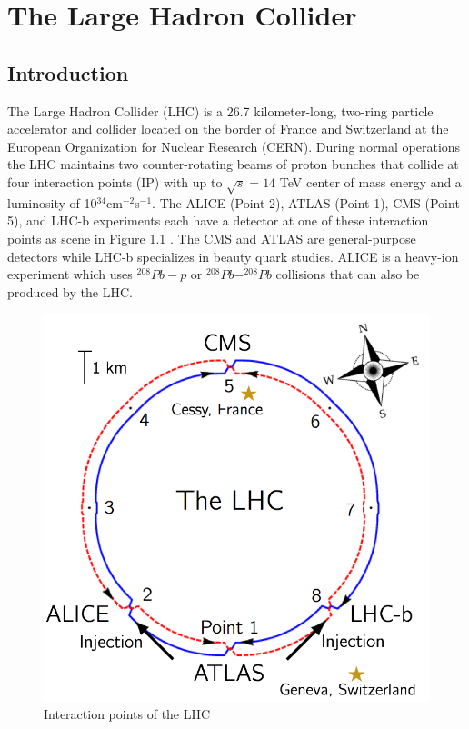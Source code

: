 \chapter{The Large Hadron Collider}

\section{Introduction}
The Large Hadron Collider (LHC) is a 26.7 kilometer-long, two-ring particle accelerator and collider located on the border of France and Switzerland at the European Organization for Nuclear Research (CERN).  During normal operations the LHC maintains two counter-rotating beams of proton bunches that collide at four interaction points (IP) with up to $\sqrt{s}=14$ TeV center of mass energy and a luminosity of 10$^{34}$cm$^{-2}$s$^{-1}$.  The ALICE (Point 2), ATLAS (Point 1), CMS (Point 5), and LHC-b experiments each have a detector at one of these interaction points as scene in Figure \ref{fig:lhcips} .  The CMS and ATLAS are general-purpose detectors while LHC-b specializes in beauty quark studies.  ALICE is a heavy-ion experiment which uses $^{208}Pb-p$ or $^{208}Pb-^{208}Pb$ collisions that can also be produced by the LHC.

\begin{figure}[h]
	\centering
	\includegraphics[width=0.7\linewidth]{Figures/LHC_IPs}
	\caption[LHC interaction points]{Interaction points of the LHC}
	\label{fig:lhcips}
\end{figure}


